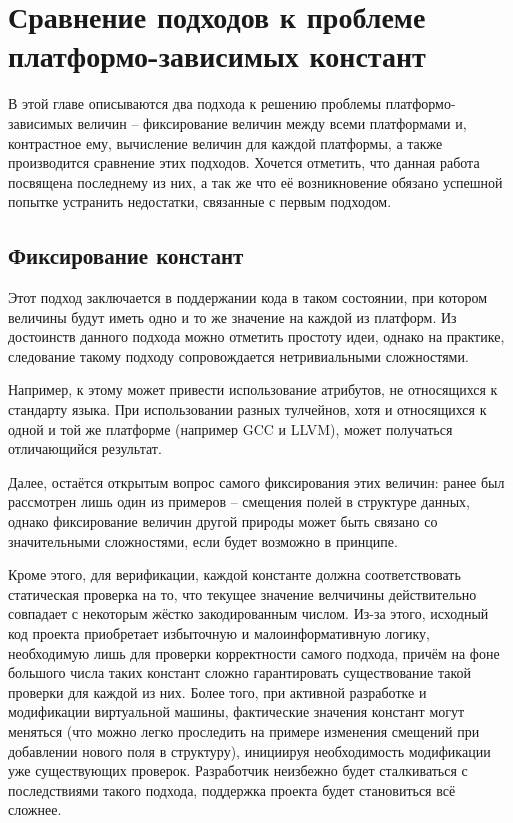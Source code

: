 \chapter{Сравнение подходов к проблеме платформо-зависимых констант}
\label{sec:Chapter2} 

В этой главе описываются два подхода к решению проблемы платформо-зависимых величин -- фиксирование величин между всеми платформами и, контрастное ему, вычисление величин для каждой платформы, а также производится сравнение этих подходов. Хочется отметить, что данная работа посвящена последнему из них, а так же что её возникновение обязано успешной попытке устранить недостатки, связанные с первым подходом.

\section{Фиксирование констант}
Этот подход заключается в поддержании кода в таком состоянии, при котором величины будут иметь одно и то же значение на каждой из платформ.
Из достоинств данного подхода можно отметить простоту идеи, однако на практике, следование такому подходу сопровождается нетривиальными сложностями.
\par
Например, к этому может привести использование атрибутов, не относящихся к стандарту языка.
При использовании разных тулчейнов, хотя и относящихся к одной и той же платформе (например GCC и LLVM), может получаться отличающийся результат.
\par
Далее, остаётся открытым вопрос самого фиксирования этих величин: ранее был рассмотрен лишь один из примеров -- смещения полей в структуре данных, однако фиксирование величин другой природы может быть связано со значительными сложностями, если будет возможно в принципе.
\par
Кроме этого, для верификации, каждой константе должна соответствовать статическая проверка на то, что текущее значение велчичины действительно совпадает с некоторым жёстко закодированным числом.
Из-за этого, исходный код проекта приобретает избыточную и малоинформативную логику, необходимую лишь для проверки корректности самого подхода, причём на фоне большого числа таких констант сложно гарантировать существование такой проверки для каждой из них.
Более того, при активной разработке и модификации виртуальной машины, фактические значения констант могут меняться (что можно легко проследить на примере изменения смещений при добавлении нового поля в структуру), инициируя необходимость модификации уже существующих проверок.
Разработчик неизбежно будет сталкиваться с последствиями такого подхода, поддержка проекта будет становиться всё сложнее.

